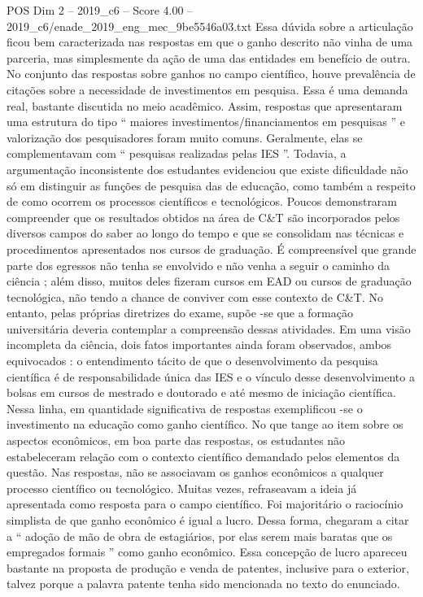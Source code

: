 \begin{textsample}{POS Dim 2 – 2019\_c6 – Score 4.00 – 2019\_c6/enade\_2019\_eng\_mec\_9be5546a03.txt}
Essa dúvida sobre a articulação ficou bem caracterizada nas respostas em que o ganho descrito não vinha de uma parceria, mas simplesmente da ação de uma das entidades em benefício de outra.
No conjunto das respostas sobre ganhos no campo científico, houve prevalência de citações sobre a necessidade de investimentos em pesquisa.
Essa é uma demanda real, bastante discutida no meio acadêmico.
Assim, respostas que apresentaram uma estrutura do tipo “ maiores investimentos/financiamentos em pesquisas ” e valorização dos pesquisadores foram muito comuns.
Geralmente, elas se complementavam com “ pesquisas realizadas pelas IES ”.
Todavia, a argumentação inconsistente dos estudantes evidenciou que existe dificuldade não só em distinguir as funções de pesquisa das de educação, como também a respeito de como ocorrem os processos científicos e tecnológicos.
Poucos demonstraram compreender que os resultados obtidos na área de C\&T são incorporados pelos diversos campos do saber ao longo do tempo e que se consolidam nas técnicas e procedimentos apresentados nos cursos de graduação.
É compreensível que grande parte dos egressos não tenha se envolvido e não venha a seguir o caminho da ciência ; além disso, muitos deles fizeram cursos em EAD ou cursos de graduação tecnológica, não tendo a chance de conviver com esse contexto de C\&T.
No entanto, pelas próprias diretrizes do exame, supõe -se que a formação universitária deveria contemplar a compreensão dessas atividades.
Em uma visão incompleta da ciência, dois fatos importantes ainda foram observados, ambos equivocados : o entendimento tácito de que o desenvolvimento da pesquisa científica é de responsabilidade única das IES e o vínculo desse desenvolvimento a bolsas em cursos de mestrado e doutorado e até mesmo de iniciação científica.
Nessa linha, em quantidade significativa de respostas exemplificou -se o investimento na educação como ganho científico.
No que tange ao item sobre os aspectos econômicos, em boa parte das respostas, os estudantes não estabeleceram relação com o contexto científico demandado pelos elementos da questão.
Nas respostas, não se associavam os ganhos econômicos a qualquer processo científico ou tecnológico.
Muitas vezes, refraseavam a ideia já apresentada como resposta para o campo científico.
Foi majoritário o raciocínio simplista de que ganho econômico é igual a lucro.
Dessa forma, chegaram a citar a “ adoção de mão de obra de estagiários, por elas serem mais baratas que os empregados formais ” como ganho econômico.
Essa concepção de lucro apareceu bastante na proposta de produção e venda de patentes, inclusive para o exterior, talvez porque a palavra patente tenha sido mencionada no texto do enunciado.

\end{textsample}
